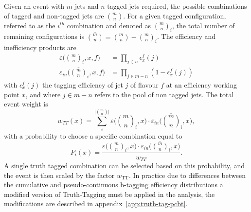Given an event with $m$ jets and $n$ tagged jets required, the possible
combinations of tagged and non-tagged jets are $\binom{m}{n}$. For a given
tagged configuration, referred to as the $i^{th}$ combination and denoted as
$\binom{m}{n}_i$, the total number of remaining configurations is
$\overline{\binom{m}{n}} = \binom{m}{n} - \binom{m}{n}_i$. The efficiency and
inefficiency products are
\begin{align}                             
  \varepsilon \Bigg( \binom{m}{n}_i, x, f \Bigg)  & = \prod_{j \in n} \epsilon_x^f(j) \\
  \varepsilon_{in} \Bigg( \overline{\binom{m}{n}}_i, x, f \Bigg) & = \prod_{j \in m-n} (1 - \epsilon_x^f(j))
\end{align}
with $ \epsilon_x^f(j)$ the tagging efficiency of jet $j$ of flavour $f$ at an
efficiency working point $x$, and where $j \in m-n $ refers to the pool of non tagged
jets. The total event weight is
\begin{equation}
  w_{TT}(x) = \sum_i^{\lvert \binom{m}{n} \rvert} \varepsilon \Bigg(  \binom{m}{n}_i, x \Bigg)  \cdot \varepsilon_{in} \Bigg(  \overline{\binom{m}{n}}_i, x \Bigg),
\end{equation}
with a probability to choose a specific combination equal to
\begin{equation}
  P_{i}(x) = \frac{\varepsilon \big(  \binom{m}{n}_i, x \big) \cdot \varepsilon_{in} \big(  \overline{ \binom{m}{n}}_i, x \big) }{w_{TT}}.
\end{equation}
A single truth tagged combination can be selected based on this probability, and
the event is then scaled by the factor $w_{\mathrm {TT}}$. In practice due to
differences between the cumulative and pseudo-continuous b-tagging efficiency
distributions a modified version of Truth-Tagging must be applied in the
analysis, the modifications are described in appendix~\ref{app:truth-tag-pcbt}.

